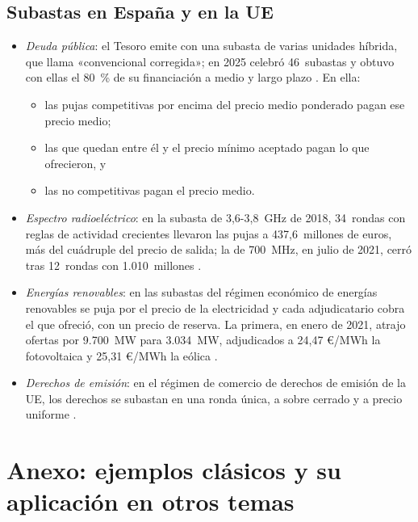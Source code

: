 \documentclass[11pt]{article}
\begin{document}
\subsection*{Subastas en España y en la UE}

\begin{itemize}
\item \emph{Deuda pública}: el Tesoro emite con una subasta de varias unidades híbrida, que llama «convencional corregida»; en 2025 celebró 46~subastas y obtuvo con ellas el 80~\% de su financiación a medio y largo plazo\nocite{Tesoro2026Estrategia} . En ella\nocite{BOE2026DeudaEstado,Tesoro2026Subasta}:
  \begin{itemize}
  \item las pujas competitivas por encima del precio medio ponderado pagan ese precio medio;
  \item las que quedan entre él y el precio mínimo aceptado pagan lo que ofrecieron, y
  \item las no competitivas pagan el precio medio.
  \end{itemize}
\item \emph{Espectro radioeléctrico}: en la subasta de 3,6-3,8~GHz de 2018, 34~rondas con reglas de actividad crecientes llevaron las pujas a 437,6~millones de euros, más del cuádruple del precio de salida\nocite{MINECO2018Subasta5G,BOE2018ECE1161}; la de 700~MHz, en julio de 2021, cerró tras 12~rondas con 1.010~millones\nocite{MINECO2021Subasta700} .
\item \emph{Energías renovables}: en las subastas del régimen económico de energías renovables se puja por el precio de la electricidad y cada adjudicatario cobra el que ofreció, con un precio de reserva\nocite{BOE2020RD960,BOE2020TED1161}. La primera, en enero de 2021, atrajo ofertas por 9.700~MW para 3.034~MW, adjudicados a 24,47 €/MWh la fotovoltaica y 25,31 €/MWh la eólica\nocite{MITECO2021PrimeraSubasta}  .
\item \emph{Derechos de emisión}: en el régimen de comercio de derechos de emisión de la UE, los derechos se subastan en una ronda única, a sobre cerrado y a precio uniforme\nocite{UE2023_2830} .
\end{itemize}

\section{Anexo: ejemplos clásicos y su aplicación en otros temas}\label{anexo:clasicos}
\end{document}
